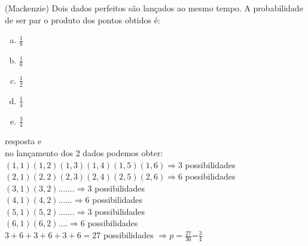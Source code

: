 \begin{ex}
 (Mackenzie) Dois dados perfeitos são lançados ao mesmo tempo. A probabilidade de ser par o produto dos pontos obtidos é:
    \begin{enumerate}[(a)]
    \item $\frac{1}{8}$
    \item $\frac{1}{6}$
    \item $\frac{1}{2}$
    \item $\frac{1}{4}$
    \item $\frac{3}{4}$
    \end{enumerate}
    \begin{sol}
    resposta e \\
    no lançamento dos 2 dados podemos obter:\\
    $(1,1) (1,2) (1,3) (1,4) (1,5) (1,6) \Rightarrow  3$ possibilidades\\
    $(2,1) (2,2) (2,3) (2,4) (2,5) (2,6) \Rightarrow  6$ possibilidades\\
    $(3,1) (3,2) .......\Rightarrow  3$  possibilidades\\
    $(4,1) (4,2) ......\Rightarrow  6$ possibilidades\\
    $(5,1) (5,2) .......\Rightarrow  3$ possibilidades\\
    $(6,1)(6,2) ....\Rightarrow  6$ possibilidades\\
    $ 3 + 6 + 3 + 6 + 3 + 6 = 27$ possibilidades 
    $\Longrightarrow p=\frac{27}{36}$=$\frac{3}{4}$
    \end{sol}
\end{ex}
